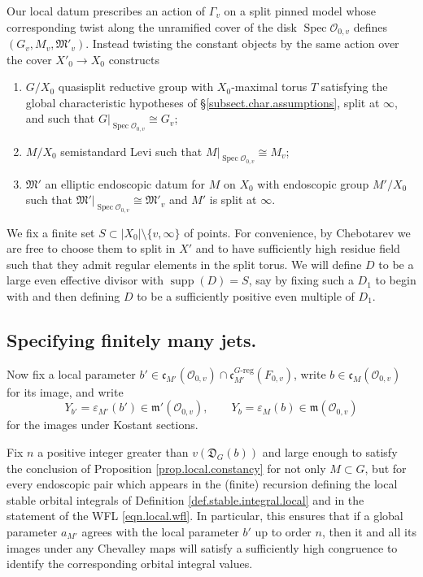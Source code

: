 \documentclass[openany]{amsbook}
\theoremstyle{definition}
\theoremstyle{remark}
\numberwithin{equation}{section}
\renewcommand{\O}{\mathcal{O}}
\renewcommand{\epsilon}{\varepsilon}
\renewcommand{\-}{\operatorname{-}}
\newcommand{\Spec}{\operatorname{Spec}}
\newcommand{\on}[1]{\operatorname{#1}}
\newcommand{\fm}{\mathfrak{m}}
\newcommand{\fc}{\mathfrak{c}}
\renewcommand{\fm}{\mathfrak{m}}
\newcommand{\fD}{\mathfrak{D}}
\newcommand{\fM}{\mathfrak{M}}
\newcommand{\Greg}{G\text{-reg}}
\begin{document}
Our local datum prescribes an action of $\Gamma_v$ on a split pinned model whose corresponding twist along the unramified cover of the disk $\Spec \O_{0,v}$ defines $(G_v, M_v, \fM'_v)$. Instead twisting the constant objects by the same action over the cover $X'_0 \to X_0$ constructs
\begin{enumerate}
    \item $G/X_0$ quasisplit reductive group with $X_0$-maximal torus $T$ satisfying the global characteristic hypotheses of \S \ref{subsect.char.assumptions}, split at $\infty$, and such that $G|_{\Spec \O_{0,v}} \cong G_v$;
    \item $M/X_0$ semistandard Levi such that $M|_{\Spec \O_{0,v}} \cong M_v$;
    \item $\fM'$ an elliptic endoscopic datum for $M$ on $X_0$ with endoscopic group $M'/X_0$ such that $\fM'|_{\Spec \O_{0,v}} \cong \fM'_v$ and $M'$ is split at $\infty$.
\end{enumerate}
We fix a finite set $S \subset |X_0| \setminus \{v, \infty\}$ of points. For convenience, by Chebotarev we are free to choose them to split in $X'$ and to have sufficiently high residue field such that they admit regular elements in the split torus. We will define $D$ to be a large even effective divisor with $\on{supp}(D) = S$, say by fixing such a $D_1$ to begin with and then defining $D$ to be a sufficiently positive even multiple of $D_1$. 







\subsection{Specifying finitely many jets.}

Now fix a local parameter $b' \in \fc_{M'}(\O_{0,v}) \cap \fc_{M'}^{\Greg}(F_{0,v})$, write $b \in \fc_M(\O_{0,v})$ for its image, and write 
$$
    Y_{b'} = \epsilon_{M'}(b') \in \fm'(\O_{0,v}), \qquad Y_b = \epsilon_M(b) \in \fm(\O_{0,v})
$$
for the images under Kostant sections. 

Fix $n$ a positive integer greater than $v(\fD_G(b))$ and large enough to satisfy the conclusion of Proposition \ref{prop.local.constancy} for not only $M \subset G$, but for every endoscopic pair which appears in the (finite) recursion defining the local stable orbital integrals of Definition \ref{def.stable.integral.local} and in the statement of the WFL \ref{eqn.local.wfl}. In particular, this ensures that if a global parameter $a_{M'}$ agrees with the local parameter $b'$ up to order $n$, then it and all its images under any Chevalley maps will satisfy a sufficiently high congruence to identify the corresponding orbital integral values.
\end{document}
